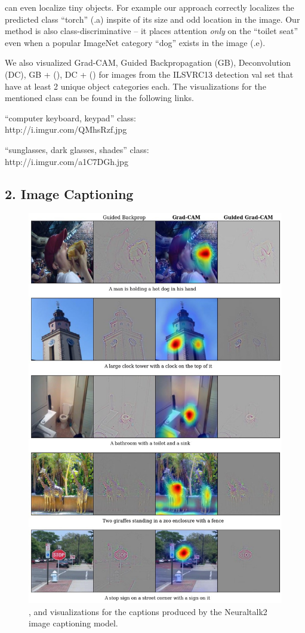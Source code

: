 \cgb{} can even localize tiny objects. For example our approach correctly localizes the predicted class ``torch'' (.a) inspite of its size and odd location in the image. Our method is also class-discriminative -- it places attention \emph{only} on the ``toilet seat'' even when a popular ImageNet category ``dog'' exists in the image (.e).


We also visualized Grad-CAM, Guided Backpropagation (GB), Deconvolution (DC), GB + \gcam{} (\cgb{}), DC + \gcam{} (\cdec{}) for images from the ILSVRC13 detection val set that have at least 2 unique object categories each.
The visualizations for the mentioned class can be found in the following links.

``computer keyboard, keypad'' class: \\http://i.imgur.com/QMhsRzf.jpg

``sunglasses, dark glasses, shades'' class: \\ http://i.imgur.com/a1C7DGh.jpg

\vspace{-10pt}
\subsection*{2. Image Captioning}

\begin{figure}
     \centering
     \includegraphics[width=0.83\linewidth]{figures/captioning_supp_new.jpg}
     \caption{\gb{}, \gcam{}  and \cgb{}  visualizations for the captions produced by the Neuraltalk2 image captioning model.}
     \label{fig:sup_captioning}
\end{figure}

